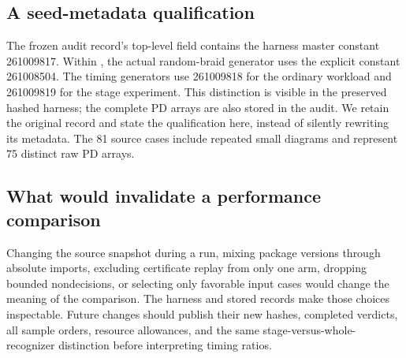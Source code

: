 \subsection{A seed-metadata qualification}

The frozen audit record's top-level  field contains the harness
master constant 261009817. Within , the actual random-braid
generator uses the explicit constant 261008504. The timing generators use
261009818 for the ordinary workload and 261009819 for the stage experiment.
This distinction is visible in the preserved hashed harness; the complete
PD arrays are also stored in the audit. We retain the original record and
state the qualification here, instead of silently rewriting its metadata.
The 81 source cases include repeated small diagrams and represent 75
distinct raw PD arrays.

\subsection{What would invalidate a performance comparison}

Changing the source snapshot during a run, mixing package versions through
absolute imports, excluding certificate replay from only one arm, dropping
bounded nondecisions, or selecting only favorable input cases would change
the meaning of the comparison. The harness and stored records make those
choices inspectable. Future changes should publish their new hashes,
completed verdicts, all sample orders, resource allowances, and the same
stage-versus-whole-recognizer distinction before interpreting timing ratios.
